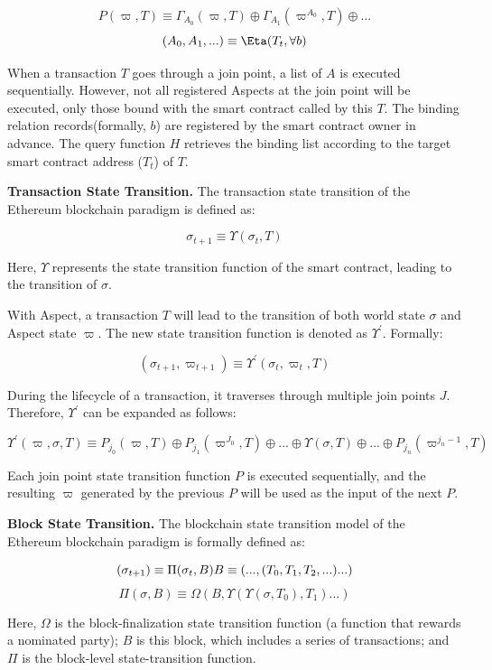 $$
P(\varpi,T)\equiv\Gamma_{A_0}(\varpi,T)\oplus\Gamma_{A_1}(\varpi^{A_0},T) \oplus ... 
$$
$$
(A_0, A_1,...) \equiv \Eta(T_t, \forall b)
$$

When a transaction $T$ goes through a join point, a list of $A$ is executed sequentially. However, not all registered Aspects at the join point will be executed, only those bound with the smart contract called by this $T$. The binding relation records(formally, $b$) are registered by the smart contract owner in advance. The query function $H$ retrieves the binding list according to the target smart contract address ($T_t$) of $T$.

\textbf{Transaction State Transition.} The transaction state transition of the Ethereum blockchain paradigm is defined as:

$$
\sigma_{t+1} \equiv \Upsilon(\sigma_{t},T)
$$

Here, $\Upsilon$ represents the state transition function of the smart contract, leading to the transition of $\sigma$. 

With Aspect, a transaction $T$ will lead to the transition of both world state $\sigma$ and Aspect state $\varpi$. The new state transition function is denoted as $\Upsilon^{'}$. Formally:

$$
(\sigma_{t+1},\varpi_{t+1}) \equiv \Upsilon^{'}(\sigma_{t},\varpi_{t},T)
$$

During the lifecycle of a transaction, it traverses through multiple join points $J$. Therefore, $\Upsilon^{'}$ can be expanded as follows:

$$
\Upsilon^{'}(\varpi, \sigma,T) \equiv P_{j_{0}}(\varpi,T) \oplus P_{j_{1}}(\varpi^{J_0},T) \oplus ... \oplus \Upsilon(\sigma,T) \oplus ... \oplus P_{j_{n}}(\varpi^{j_n-1},T)
$$

Each join point state transition function $P$ is executed sequentially, and the resulting $\varpi$ generated by the previous $P$ will be used as the input of the next $P$. 

\textbf{Block State Transition.} The blockchain state transition model of the Ethereum blockchain paradigm is formally defined as:

$$
(\sigma_{t+1}) \equiv\Pi( \sigma_{t},B) \\ B \equiv (...,(T_0,T_1,T_2,...)...)
$$
$$
\Pi( \sigma,B)\equiv \Omega(B, \Upsilon(\Upsilon( \sigma,T_0),T_1)...)
$$

Here, $\Omega$  is the block-finalization state transition function (a function that rewards a nominated party); $B$ is this block, which includes a series of transactions; and $\Pi$ is the block-level state-transition function.

